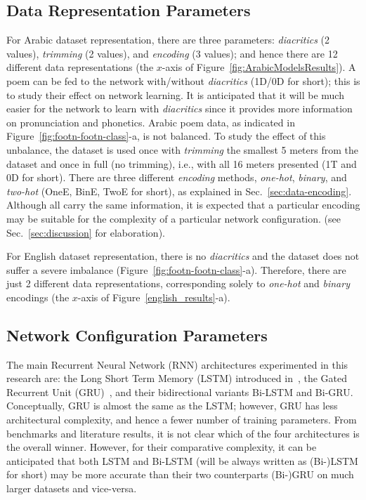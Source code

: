 \documentclass[journal,10pt,twocolumns,letter]{IEEEtran}
\begin{document}
\subsection{Data Representation Parameters}\label{sec:param-data-repr-1}
For Arabic dataset representation, there are three parameters: \textit{diacritics} (2 values),
\textit{trimming} (2 values), and \textit{encoding} (3 values); and hence there are 12 different
data representations (the $x$-axis of Figure~\ref{fig:ArabicModelsResults}). A poem can be fed to the
network with/without \textit{diacritics} (1D/0D for short); this is to study their effect on
network learning. It is anticipated that it will be much easier for the network to learn with
\textit{diacritics} since it provides more information on pronunciation and phonetics. Arabic poem
data, as indicated in Figure~\ref{fig:footn-footn-class}-a, is not balanced. To study the effect of
this unbalance, the dataset is used once with \textit{trimming} the smallest 5 meters from the
dataset and once in full (no trimming), i.e., with all 16 meters presented (1T and 0D for
short). There are three different \textit{encoding} methods, \textit{one-hot}, \textit{binary}, and
\textit{two-hot} (OneE, BinE, TwoE for short), as explained in
Sec.~\ref{sec:data-encoding}. Although all carry the same information, it is expected that a
particular encoding may be suitable for the complexity of a particular network configuration. (see
Sec.~\ref{sec:discussion} for elaboration).

For English dataset representation, there is no \textit{diacritics} and the dataset does not suffer
a severe imbalance (Figure~\ref{fig:footn-footn-class}-a). Therefore, there are just 2 different
data representations, corresponding solely to \textit{one-hot} and \textit{binary} encodings (the
$x$-axis of Figure~\ref{english_results}-a).


\subsection{Network Configuration Parameters}\label{sec:param-netw-conf}
The main Recurrent Neural Network (RNN) architectures experimented in this research are: the Long
Short Term Memory (LSTM) introduced in~\cite{Hochreiter1997LongShortTermMemory}, the Gated Recurrent
Unit (GRU)~\citep{Cho2014LearningPhraseRepresentationsUsing}, and their bidirectional variants
Bi-LSTM and Bi-GRU\@. Conceptually, GRU is almost the same as the LSTM; however, GRU has less
architectural complexity, and hence a fewer number of training parameters. From benchmarks and
literature results, it is not clear which of the four architectures is the overall winner. However,
for their comparative complexity, it can be anticipated that both LSTM and Bi-LSTM (will be always
written as (Bi-)LSTM for short) may be more accurate than their two counterparts (Bi-)GRU on much
larger datasets and vice-versa.
\end{document}
